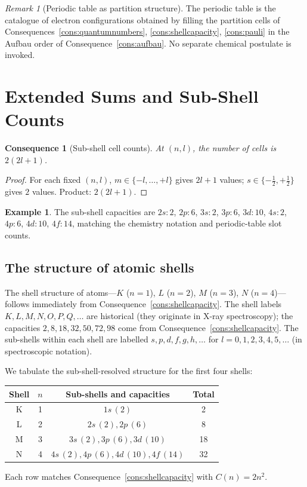 \documentclass[11pt,twocolumn,a4paper]{article}
\theoremstyle{axiomstyle}
\theoremstyle{conseqstyle}
\newtheorem{consequence}{Consequence}
\theoremstyle{definition}
\newtheorem{example}{Example}
\theoremstyle{remark}
\newtheorem*{remark}{Remark}
\begin{document}
\begin{remark}[Periodic table as partition structure]
The periodic table is the catalogue of electron configurations obtained by filling the partition cells of Consequences~\ref{cons:quantumnumbers}, \ref{cons:shellcapacity}, \ref{cons:pauli} in the Aufbau order of Consequence~\ref{cons:aufbau}. No separate chemical postulate is invoked.
\end{remark}

\section{Extended Sums and Sub-Shell Counts}
\label{sec:subshellcounts}

\begin{consequence}[Sub-shell cell counts]
\label{cons:subshellcounts}
At $(n,l)$, the number of cells is $2(2l+1)$.
\end{consequence}

\begin{proof}
For each fixed $(n,l)$, $m\in\{-l,\ldots,+l\}$ gives $2l+1$ values; $s\in\{-\tfrac{1}{2},+\tfrac{1}{2}\}$ gives $2$ values. Product: $2(2l+1)$.
\end{proof}

\begin{example}
The sub-shell capacities are $2s:2$, $2p:6$, $3s:2$, $3p:6$, $3d:10$, $4s:2$, $4p:6$, $4d:10$, $4f:14$, matching the chemistry notation and periodic-table slot counts.
\end{example}

\subsection{The structure of atomic shells}

The shell structure of atoms---$K$ ($n=1$), $L$ ($n=2$), $M$ ($n=3$), $N$ ($n=4$)---follows immediately from Consequence~\ref{cons:shellcapacity}. The shell labels $K, L, M, N, O, P, Q, \ldots$ are historical (they originate in X-ray spectroscopy); the capacities $2, 8, 18, 32, 50, 72, 98$ come from Consequence~\ref{cons:shellcapacity}. The sub-shells within each shell are labelled $s, p, d, f, g, h, \ldots$ for $l=0, 1, 2, 3, 4, 5, \ldots$ (in spectroscopic notation).

We tabulate the sub-shell-resolved structure for the first four shells:
\begin{center}
\begin{tabular}{c|c|c|c}
\toprule
Shell & $n$ & Sub-shells and capacities & Total\\
\midrule
K & 1 & $1s\,(2)$                    & 2\\
L & 2 & $2s\,(2),2p\,(6)$             & 8\\
M & 3 & $3s\,(2),3p\,(6),3d\,(10)$   & 18\\
N & 4 & $4s\,(2),4p\,(6),4d\,(10),4f\,(14)$ & 32\\
\bottomrule
\end{tabular}
\end{center}
Each row matches Consequence~\ref{cons:shellcapacity} with $C(n)=2n^{2}$.
\end{document}
